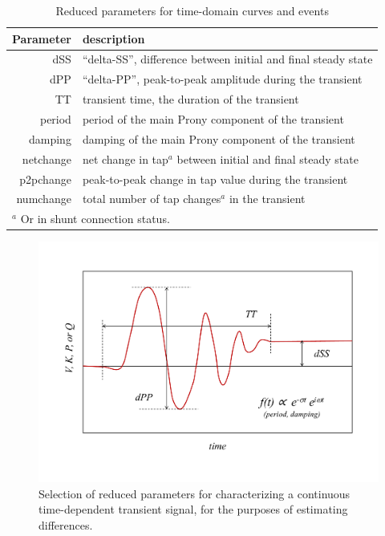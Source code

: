 \documentclass[conference]{IEEEtran}
\begin{document}
\begin{table}
  \caption{Reduced parameters for time-domain curves and events}
  \centering
  \begin{tabular}{@{}rl@{}}
    \toprule
    \textbf{Parameter} & \textbf{description}                                            \\
    \midrule
    dSS                & ``delta-SS'', difference between initial and final steady state \\
    dPP                & ``delta-PP'', peak-to-peak amplitude during the transient       \\
    TT                 & transient time, the duration of the transient                   \\
    period             & period of the main Prony component of the transient             \\
    damping            & damping of the main Prony component of the transient            \\
    netchange          & net change in tap$^a$ between initial and final steady state    \\
    p2pchange          & peak-to-peak change in tap value during the transient           \\
    numchange          & total number of tap changes$^a$ in the transient                \\
    \bottomrule
    \multicolumn{2}{l}{$^a$ Or in shunt connection status.}
  \end{tabular}
  \label{tab:reducedparams}
\end{table}

\begin{figure}
  \centering
  \includegraphics[width=\columnwidth]{figs/transient_characteristics_1}
  \caption{Selection of reduced parameters for characterizing a continuous
    time-dependent transient signal, for the purposes of estimating
    differences.}
  \label{fig:tcharacteristics1}
\end{figure}
\end{document}
